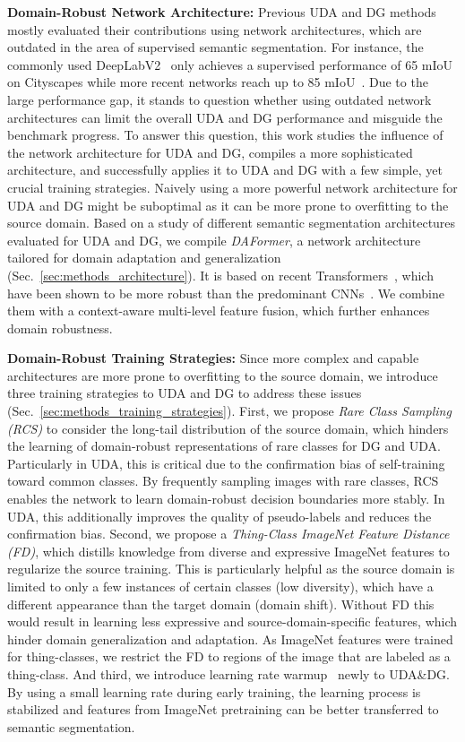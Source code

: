 \documentclass[journal,compsoc]{IEEEtran}
\begin{document}
\noindent\textbf{Domain-Robust Network Architecture:}
Previous UDA and DG methods mostly evaluated their contributions using network architectures, which are outdated in the area of supervised semantic segmentation. For instance, the commonly used DeepLabV2~\cite{chen2017deeplab} only achieves a supervised performance of 65 mIoU~\cite{tsai2018learning} on Cityscapes while more recent networks reach up to 85 mIoU~\cite{yuan2020object, tao2020hierarchical}.
Due to the large performance gap, it stands to question whether using outdated network architectures can limit the overall UDA and DG performance and misguide the benchmark progress. To answer this question, this work studies the influence of the network architecture for UDA and DG, compiles a more sophisticated architecture, and successfully applies it to UDA and DG with a few simple, yet crucial training strategies.
Naively using a more powerful network architecture for UDA and DG might be suboptimal as it can be more prone to overfitting to the source domain.
Based on a study of different semantic segmentation architectures evaluated for UDA and DG, we compile \emph{DAFormer}, a network architecture tailored for domain adaptation and generalization (Sec.~\ref{sec:methods_architecture}). It is based on recent Transformers~\cite{dosovitskiy2020image, xie2021segformer}, which have been shown to be more robust than the predominant CNNs~\cite{bhojanapalli2021understanding}. We combine them with a context-aware multi-level feature fusion, which further enhances domain robustness. 

\noindent\textbf{Domain-Robust Training Strategies:}
Since more complex and capable architectures are more prone to overfitting to the source domain, we introduce three training strategies to UDA and DG to address these issues (Sec.~\ref{sec:methods_training_strategies}).
First, we propose \emph{Rare Class Sampling (RCS)} to consider the long-tail distribution of the source domain, which hinders the learning of domain-robust representations of rare classes for DG and UDA. Particularly in UDA, this is critical due to the confirmation bias of self-training toward common classes. By frequently sampling images with rare classes, RCS enables the network to learn domain-robust decision boundaries more stably. In UDA, this additionally improves the quality of pseudo-labels and reduces the confirmation bias.
Second, we propose a \emph{Thing-Class ImageNet Feature Distance (FD)}, which distills knowledge from diverse and expressive ImageNet features to regularize the source training. This is particularly helpful as the source domain is limited to only a few instances of certain classes (low diversity), which have a different appearance than the target domain (domain shift). Without FD this would result in learning less expressive and source-domain-specific features, which hinder domain generalization and adaptation. As ImageNet features were trained for thing-classes, we restrict the FD to regions of the image that are labeled as a thing-class.
And third, we introduce learning rate warmup~\cite{goyal2017accurate} newly to UDA\&DG. By using a small learning rate during early training, the learning process is stabilized and features from ImageNet pretraining can be better transferred to semantic segmentation.
\end{document}
